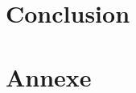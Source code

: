 \documentclass[a4paper]{article}
\begin{document}

\section{Conclusion}

\clearpage

\section{Annexe}
\end{document}
